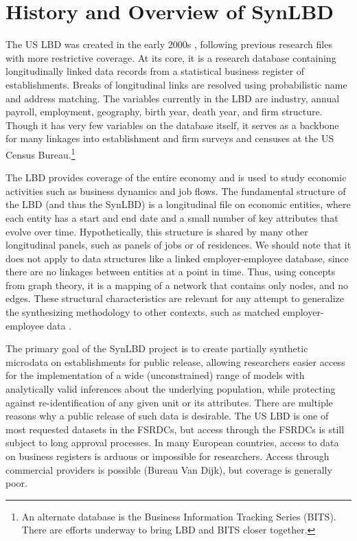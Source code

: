 \documentclass[letterpaper,12pt]{article}
\begin{document}
\section{History and Overview of SynLBD}
The US LBD was created in the early 2000s \citep{MirandaJarmin2002}, following previous research files with more restrictive coverage. At its core, it is a research database containing longitudinally linked data records from a statistical business register of establishments. Breaks of longitudinal links are resolved using probabilistic name and address matching. The variables currently in the LBD are industry, annual payroll, employment, geography, birth year, death year, and firm structure. Though it has very few variables on the database itself, it serves as a backbone for many linkages into establishment and firm surveys and censuses at the US Census Bureau.\footnote{An alternate database is the Business Information Tracking Series (BITS). There are efforts underway to bring LBD and BITS closer together. }

The LBD provides coverage of the entire economy and is used to study economic activities such as business dynamics and job flows. The fundamental structure of the LBD (and thus the SynLBD) is a longitudinal file on  economic entities, where each entity has a start and end date and a small number of key attributes that evolve over time. Hypothetically, this structure is shared by many other longitudinal panels, such as panels of jobs or of residences. We should note that it does not apply to data structures like a linked employer-employee database, since there are no linkages between entities at a point in time. Thus, using concepts from graph theory, it is a mapping of a network that contains only nodes, and no edges. These structural characteristics are relevant for any attempt to generalize the synthesizing methodology to other contexts, such as matched employer-employee data \citep[but see][]{Barrientos2017}.

The primary goal of the SynLBD project is to create partially synthetic microdata on establishments for public release, allowing researchers easier access for the implementation of a wide (unconstrained) range of models with analytically valid inferences about the underlying population, while protecting against re-identification of any given unit or its attributes. There are multiple reasons why a public release of such data is desirable. The US LBD is one of most requested datasets in the \acp{FSRDC}, but access through the FSRDCs is still subject to long approval processes. In many European countries, access to data on business registers is arduous or impossible for researchers. Access through commercial providers is possible (Bureau Van Dijk), but coverage is generally poor.
\end{document}
